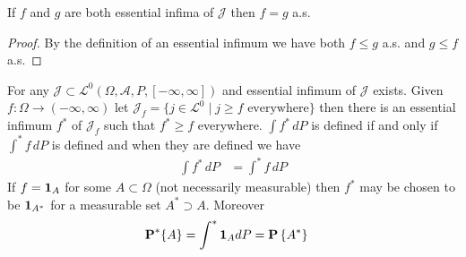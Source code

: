 \begin{prop}\label{AlmostSureUniquenessEssentialInfimum}If $f$ and $g$ are both essential infima of $\mathcal{J}$ then $f = g$ a.s.
\end{prop}
\begin{proof}
By the definition of an essential infimum we have both $f \leq g$ a.s. and $g \leq f$ a.s.
\end{proof}

\begin{thm}\label{ExistenceMeasurableCover}For any $\mathcal{J} \subset \mathcal{L}^0(\Omega, \mathcal{A}, P, [-\infty, \infty])$ and essential infimum of $\mathcal{J}$ exists.  Given $f : \Omega \to (-\infty, \infty)$ let
$\mathcal{J}_f = \lbrace j \in \mathcal{L}^0 \mid j \geq f \text{ everywhere} \rbrace$ then there is an essential infimum $f^*$ of $\mathcal{J}_f$ such that $f^* \geq f$ everywhere.  $\int f^* \, dP$ is 
defined if and only if $\int^* f \, dP$ is defined and when they are defined we have
\begin{align*}
\int f^* \, dP &= \int^* f \, dP
\end{align*}
If $f = \textbf{1}_{A}$ for some $A \subset \Omega$ (not necessarily measurable) then $f^*$ may be chosen to be $\textbf{1}_{A^*}$ for a measurable set $A^* \supset A$.  Moreover \begin{align*}
\textbf{P}^*\{A\} &= \int^* \textbf{1}_{A} dP = \textbf{P}\left \{A^* \right \}
\end{align*}
\end{thm}
